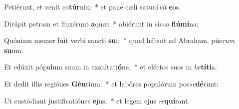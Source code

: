 \item Petiérunt, et venit co\textbf{túr}nix:~* et pane cæli saturá\textit{vit} \textbf{e}os.
\item Dirúpit petram et fluxérunt \textbf{a}quæ:~* abiérunt in sic\textit{co} \textbf{flú}\textbf{mi}na;
\item Quóniam memor fuit verbi sancti \textbf{su}i:~* quod hábuit ad Abraham, púe\textit{rum} \textbf{su}um.
\item Et edúxit pópulum suum in exsultati\textbf{ó}ne,~* et eléctos suos in \textit{læ}\textbf{tí}\textbf{ti}a.
\item Et dedit illis regiónes \textbf{Gén}tium:~* et labóres populórum pos\textit{se}\textbf{dé}runt:
\item Ut custódiant justificatiónes \textbf{e}jus,~* et legem ejus \textit{re}\textbf{quí}rant.
